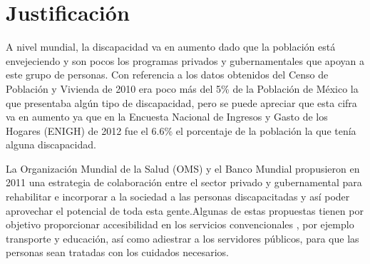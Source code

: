 
\section{Justificación}
A nivel mundial, la discapacidad va en aumento dado que la población está
 envejeciendo y son pocos los programas privados y gubernamentales que apoyan a
 este grupo de personas\cite{OrganizacionMundialdelaSalud2011}. 
 Con referencia a los datos obtenidos del Censo de Población
 y Vivienda de 2010 era poco más del 5\% de la Población de México la que
 presentaba algún tipo de discapacidad, pero se puede apreciar que esta cifra va
 en aumento ya que en la Encuesta Nacional de Ingresos y Gasto de los Hogares
 (ENIGH) de 2012 fue el 6.6\% el porcentaje de la población la que tenía alguna
 discapacidad\cite{Milosavljevic2014}.
 


 
La Organización Mundial de la Salud (OMS) y el Banco Mundial
 propusieron en 2011 \cite{OrganizacionMundialdelaSalud2011} una
 estrategia de colaboración entre el sector privado y gubernamental para
 rehabilitar e incorporar a la sociedad a las personas discapacitadas y así
 poder aprovechar el potencial de toda esta gente.Algunas de estas propuestas
 tienen por objetivo proporcionar accesibilidad en los servicios convencionales
 , por ejemplo transporte y educación, así como adiestrar a los servidores
 públicos, para que las personas sean tratadas con los cuidados necesarios.
 